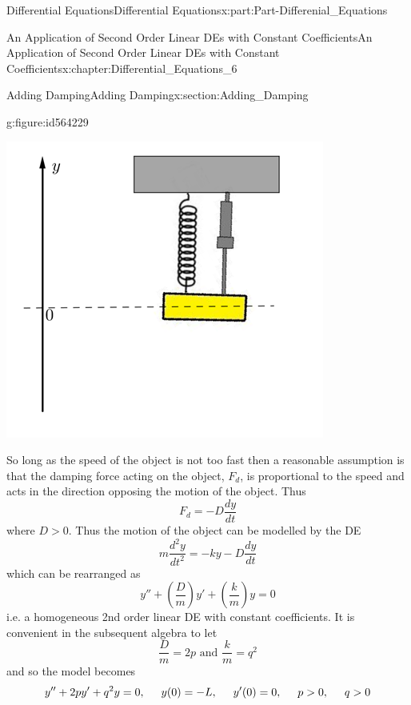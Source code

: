\documentclass[oneside,10pt,]{book}
\newcommand{\terminology}[1]{\textbf{#1}}
\numberwithin{equation}{section}
\newcommand{\gt}{>}
\begin{document}
\begin{partptx}{Differential Equations}{}{Differential Equations}{}{}{x:part:Part-Differenial_Equations}
\begin{chapterptx}{An Application of Second Order Linear DEs with Constant Coefficients}{}{An Application of Second Order Linear DEs with Constant Coefficients}{}{}{x:chapter:Differential_Equations_6}
\begin{sectionptx}{Adding Damping}{}{Adding Damping}{}{}{x:section:Adding_Damping}
\begin{figureptx}{}{g:figure:id564229}{}
\begin{image}{0.2}{0.6}{0.2}
\includegraphics[width=\linewidth]{./DifferentialEquations/Images/6/figure_4.png}
\end{image}%
\tcblower
\end{figureptx}%
 So long as the speed of the object is not too fast then a reasonable assumption is that the damping force acting on the object, \terminology{\(F_d\)},  is proportional to the speed and acts in the direction opposing  the motion of the object. Thus%
\begin{equation*}
F_d=-D\frac{dy}{dt}
\end{equation*}
where \(D\gt 0\). Thus the motion of the object can be modelled by the DE%
\begin{equation*}
m\frac{d^2y}{dt^2}=-ky-D\frac{dy}{dt}
\end{equation*}
which can be rearranged as%
\begin{equation*}
y''+\left(\frac{D}{m}\right)y'+\left(\frac{k}{m}\right)y=0
\end{equation*}
i.e. a homogeneous 2nd order linear DE with constant coefficients. It is convenient in the subsequent algebra to let%
\begin{equation*}
\frac{D}{m}=2p \textrm{ and } \frac{k}{m}=q^2
\end{equation*}
and so the model becomes%
\begin{equation}
y''+2py'+q^2y=0,\hspace{5mm} y(0)=-L,\hspace{5mm} y'(0)=0, \hspace{5mm}p\gt 0,\hspace{5mm} q\gt 0\label{g:men:id564266}

\end{equation}
\end{sectionptx}
\end{chapterptx}
\end{partptx}
\end{document}
